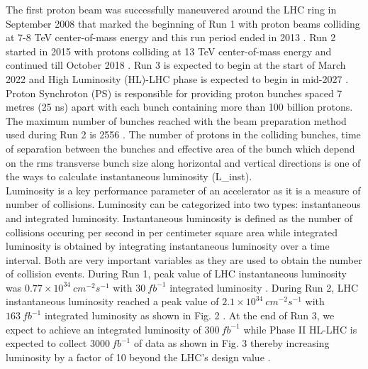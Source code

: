 The first proton beam was successfully maneuvered around the LHC ring in September 2008 that marked the beginning of Run 1 with proton beams colliding at 7-8 TeV center-of-mass energy and this run period ended in 2013 \cite{cmsrun} \cite{Alemany-Fernandez:1631030}. Run 2 started in 2015 with protons colliding at 13 TeV center-of-mass energy and continued till October 2018 \cite{Wenninger:2668326}. Run 3 is expected to begin at the start of March 2022 and High Luminosity (HL)-LHC phase is expected to begin in mid-2027 \cite{Dainese:2019rgk}. Proton Synchroton (PS) is responsible for providing proton bunches spaced 7 metres (25 ns) apart with each bunch containing more than 100 billion protons. The maximum number of bunches reached with the beam preparation method used during Run 2 is 2556 \cite{Wenninger:2668326}. The number of protons in the colliding bunches, time of separation between the bunches and effective area of the bunch which depend on the rms transverse bunch size along horizontal and vertical directions is one of the ways to calculate instantaneous luminosity (L_{inst}). \\

Luminosity is a key performance parameter of an accelerator as it is a measure of number of collisions. Luminosity can be categorized into two types: instantaneous and integrated luminosity. Instantaneous luminosity is defined as the number of collisions occuring per second in per centimeter square area while integrated luminosity is obtained by integrating instantaneous luminosity over a time interval. Both are very important variables as they are used to obtain the number of collision events. During Run 1, peak value of LHC instantaneous luminosity was $0.77 \times 10^{34} \: cm^{-2} s^{-1} $ with $30 \: fb^{-1}$ integrated luminosity \cite{cmsrun1lumi}. During Run 2, LHC instantaneous luminosity reached a peak value of $2.1 \times 10^{34}  \: cm^{-2} s^{-1}$ with $163 \: fb^{-1}$ integrated luminosity as shown in Fig. 2 \cite{CMS:2018elu}. At the end of Run 3, we expect to achieve an integrated luminosity  of $300 \:fb^{-1}$ while Phase II HL-LHC is expected to collect $3000 \:fb^{-1}$ of data as shown in Fig. 3 thereby increasing luminosity by a factor of 10 beyond the LHC's design value \cite{Dainese:2019rgk}. \\


